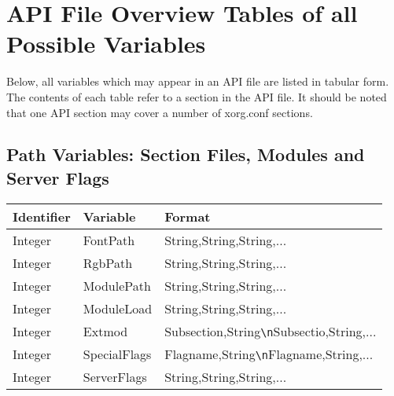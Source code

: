 \section{API File Overview Tables of all Possible Variables}
Below, all variables which may appear in an API file are listed in tabular
form. The contents of each table refer to a section in the API file. It should
be noted that one API section may cover a number of xorg.conf sections.

\subsection{Path Variables: Section Files, Modules and Server Flags}
\begin{tabular}[h]{|p{2cm}|p{4cm}|p{7cm}|}
 \hline
 \textbf{Identifier} & \textbf{Variable}     & \textbf{Format}                \\
 \hline
 Integer & FontPath     & String,String,String,...                       \\
 Integer & RgbPath      & String,String,String,...                       \\ 
 Integer & ModulePath   & String,String,String,...                       \\
 Integer & ModuleLoad   & String,String,String,...                       \\
 Integer & Extmod       & Subsection,String\verb+\n+Subsectio,String,... \\ 
 Integer & SpecialFlags & Flagname,String\verb+\n+Flagname,String,...    \\
 Integer & ServerFlags  & String,String,String,...                       \\
 \hline
\end{tabular}

